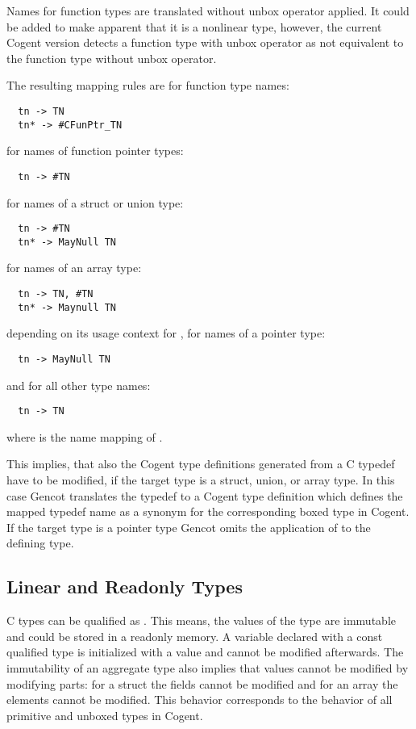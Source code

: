 Names for function types are translated without unbox operator applied. It could be added to make apparent that it is
a nonlinear type, however, the current Cogent version detects a function type with unbox operator as not equivalent to
the function type without unbox operator.

The resulting mapping rules are for function type names:
\begin{verbatim}
  tn -> TN
  tn* -> #CFunPtr_TN
\end{verbatim}
for names of function pointer types:
\begin{verbatim}
  tn -> #TN
\end{verbatim}
for names of a struct or union type:
\begin{verbatim}
  tn -> #TN
  tn* -> MayNull TN
\end{verbatim}
for names of an array type:
\begin{verbatim}
  tn -> TN, #TN
  tn* -> Maynull TN
\end{verbatim}
depending on its usage context for , 
for names of a pointer type:
\begin{verbatim}
  tn -> MayNull TN
\end{verbatim}
and for all other type names:
\begin{verbatim}
  tn -> TN
\end{verbatim}
where  is the name mapping of .

This implies, that also the Cogent type definitions generated from a C typedef have to be modified, if
the target type is a struct, union, or array type. In this case Gencot translates the typedef 
to a Cogent type definition which defines the mapped typedef name as a synonym 
for the corresponding boxed type in Cogent. If the target type is a pointer type Gencot omits the 
application of  to the defining type.

\subsection{Linear and Readonly Types}
\label{design-types-readonly}

C types can be qualified as . This means, the values of the type are immutable and could be stored in 
a readonly memory. A variable declared with a const qualified type is initialized with a value and cannot be modified 
afterwards. The immutability of an aggregate type also implies that values cannot be modified by modifying parts: 
for a struct the fields cannot be modified and for an array the elements cannot be modified. This behavior corresponds 
to the behavior of all primitive and unboxed types in Cogent. 

